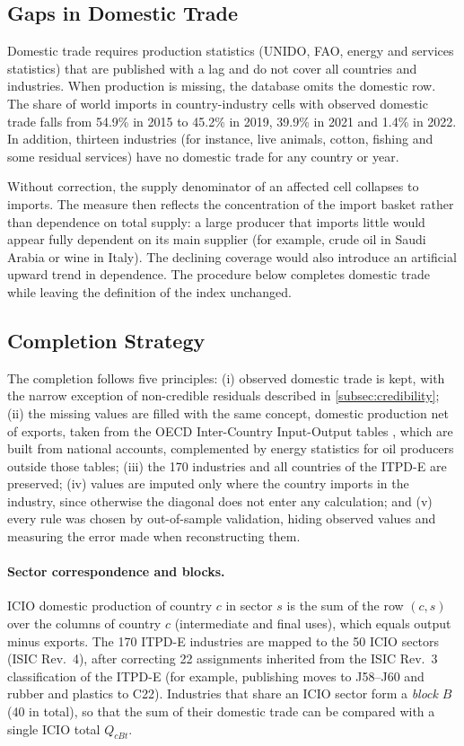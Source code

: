 \documentclass[final,1p,times,authoryear]{elsarticle}
\begin{document}
\subsection{Gaps in Domestic Trade}
Domestic trade requires production statistics (UNIDO, FAO, energy and services statistics) that are published with a lag and do not cover all countries and industries. When production is missing, the database omits the domestic row. The share of world imports in country-industry cells with observed domestic trade falls from 54.9\% in 2015 to 45.2\% in 2019, 39.9\% in 2021 and 1.4\% in 2022. In addition, thirteen industries (for instance, live animals, cotton, fishing and some residual services) have no domestic trade for any country or year.

Without correction, the supply denominator of an affected cell collapses to imports. The measure then reflects the concentration of the import basket rather than dependence on total supply: a large producer that imports little would appear fully dependent on its main supplier (for example, crude oil in Saudi Arabia or wine in Italy). The declining coverage would also introduce an artificial upward trend in dependence. The procedure below completes domestic trade while leaving the definition of the index unchanged.

\subsection{Completion Strategy}
The completion follows five principles: (i) observed domestic trade is kept, with the narrow exception of non-credible residuals described in \cref{subsec:credibility}; (ii) the missing values are filled with the same concept, domestic production net of exports, taken from the OECD Inter-Country Input-Output tables \citep{OECDICIO}, which are built from national accounts, complemented by energy statistics for oil producers outside those tables; (iii) the 170 industries and all countries of the ITPD-E are preserved; (iv) values are imputed only where the country imports in the industry, since otherwise the diagonal does not enter any calculation; and (v) every rule was chosen by out-of-sample validation, hiding observed values and measuring the error made when reconstructing them.

\paragraph{Sector correspondence and blocks.} ICIO domestic production of country $c$ in sector $s$ is the sum of the row $(c,s)$ over the columns of country $c$ (intermediate and final uses), which equals output minus exports. The 170 ITPD-E industries are mapped to the 50 ICIO sectors (ISIC Rev.~4), after correcting 22 assignments inherited from the ISIC Rev.~3 classification of the ITPD-E (for example, publishing moves to J58--J60 and rubber and plastics to C22). Industries that share an ICIO sector form a \emph{block} $B$ (40 in total), so that the sum of their domestic trade can be compared with a single ICIO total $Q_{cBt}$.
\end{document}
